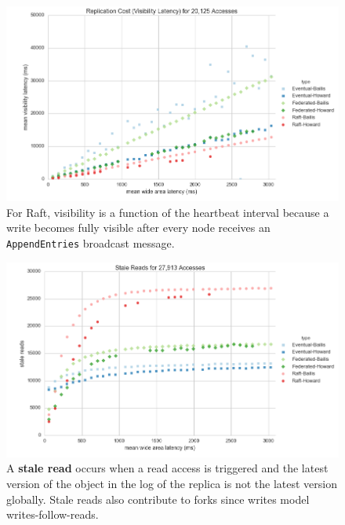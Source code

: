 \documentclass[11pt,letterpaper]{article}
\begin{document}
\begin{figure}[!h]
    \centering
        \includegraphics[width=\textwidth]{figures/visibility_latency.png}
        \caption{\textsf{For Raft, visibility is a function of the heartbeat interval because a write becomes fully visible after every node receives an \texttt{AppendEntries} broadcast message.}}
        \label{fig:visibility_latency}
\end{figure}

\begin{figure}[!h]
    \centering
        \includegraphics[width=\textwidth]{figures/stale_reads.png}
        \caption{\textsf{A \textbf{stale read} occurs when a read access is triggered and the latest version of the object in the log of the replica is not the latest version globally. Stale reads also contribute to forks since writes model writes-follow-reads.}}
        \label{fig:stale_reads}
\end{figure}
\end{document}
